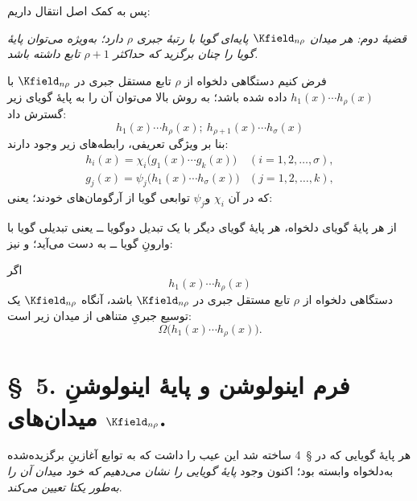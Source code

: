 \documentclass[11pt]{article}
\begin{document}
پس به کمک اصل انتقال داریم:

\emph{قضیهٔ دوم: هر میدان $\Kfield_{n\rho}$ پایه‌ای گویا با رتبهٔ جبری $\rho$ دارد؛ به‌ویژه می‌توان پایهٔ گویا را چنان برگزید که حداکثر $\rho+1$ تابع داشته باشد.}

فرض کنیم دستگاهی دلخواه از $\rho$ تابع مستقل جبری در $\Kfield_{n\rho}$ با $h_1(x)\cdots h_\rho(x)$ داده شده باشد؛ به روش بالا می‌توان آن را به پایهٔ گویای زیر گسترش داد:
\[
h_1(x)\cdots h_\rho(x);\ h_{\rho+1}(x)\cdots h_\sigma(x)
\]
بنا بر ویژگی تعریفی، رابطه‌های زیر وجود دارند:
\[
\begin{array}{ll}
h_i(x)=\chi_i\bigl(g_1(x)\cdots g_k(x)\bigr)&(i=1,2,\ldots,\sigma),\\
g_j(x)=\psi_j\bigl(h_1(x)\cdots h_\sigma(x)\bigr)&(j=1,2,\ldots,k),
\end{array}
\]
که در آن $\chi_i$ و$\psi_j$ توابعی گویا از آرگومان‌های خودند؛ یعنی:

از هر پایهٔ گویای دلخواه، هر پایهٔ گویای دیگر با یک تبدیل دوگویا ــ یعنی تبدیلی گویا با وارونِ گویا ــ به دست می‌آید؛ و نیز:

اگر
\[
h_1(x)\cdots h_\rho(x)
\]
دستگاهی دلخواه از $\rho$ تابع مستقل جبری در $\Kfield_{n\rho}$ باشد، آنگاه $\Kfield_{n\rho}$ یک توسیع جبریِ متناهی از میدان زیر است:
\[
\Omega\bigl(h_1(x)\cdots h_\rho(x)\bigr).
\]

\section*{\S\ 5. فرم اینولوشن و پایهٔ اینولوشنِ میدان‌های $\Kfield_{n\rho}$.}

هر پایهٔ گویایی که در \S\ 4 ساخته شد این عیب را داشت که به توابع آغازینِ برگزیده‌شده به‌دلخواه وابسته بود؛ اکنون وجود \emph{پایهٔ گویایی را نشان می‌دهیم که خود میدان آن را به‌طور یکتا تعیین می‌کند}.
\end{document}
